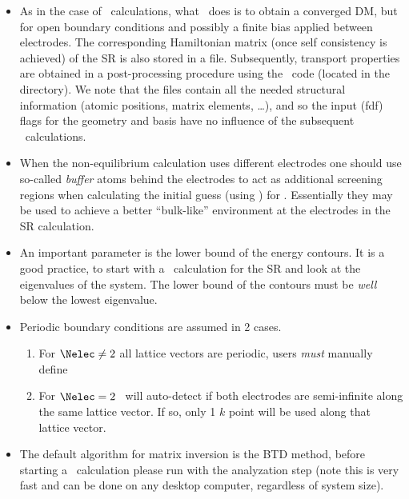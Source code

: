 \begin{itemize}
  \item %
  As in the case of \siesta\ calculations, what \tsiesta\ does is to
  obtain a converged DM, but for open boundary conditions and possibly
  a finite bias applied between electrodes. The corresponding
  Hamiltonian matrix (once self consistency is achieved) of the SR is
  also stored in a  file. Subsequently, transport
  properties are obtained in a post-processing procedure using the
  \tbtrans\ code (located in the 
  directory). We note that the  files contain all the
  needed structural information (atomic positions, matrix elements,
  \ldots), and so the input (fdf) flags for the geometry and basis
  have no influence of the subsequent \tbtrans\ calculations.

  \item %
  When the non-equilibrium calculation uses different electrodes one
  should use so-called \emph{buffer} atoms behind the electrodes to act
  as additional screening regions when calculating the initial guess
  (using \siesta) for \tsiesta. Essentially they may be used to
  achieve a better ``bulk-like'' environment at the electrodes in the
  SR calculation.

  
  \item%
  An important parameter is the lower bound of the energy contours. It
  is a good practice, to start with a \siesta\ calculation for the SR
  and look at the eigenvalues of the system. The lower bound of the
  contours must be \emph{well} below the lowest eigenvalue.

  \item%
  Periodic boundary conditions are assumed in 2 cases.

  \begin{enumerate}
    \item For $\Nelec\neq 2$ all lattice vectors are periodic, users
    \emph{must} manually define 

    \item For $\Nelec=2$ \tsiesta\ will auto-detect if both electrodes
    are semi-infinite along the same lattice vector. If so, only 1 $k$
    point will be used along that lattice vector.
  \end{enumerate}

  \item%
  The default algorithm for matrix inversion is the BTD method, before
  starting a \tsiesta\ calculation please run with the analyzation
  step  (note this is very fast and can be done on any
  desktop computer, regardless of system size).


\end{itemize}
